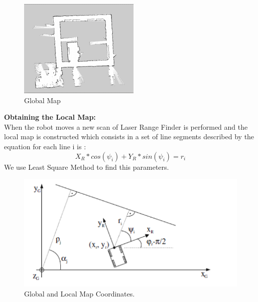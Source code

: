 \documentclass[a4paper]{IEEEtran}
\begin{document}
\begin{figure}[htp]
  \centering
  \includegraphics[width=0.9\columnwidth]{./map3}
  \caption{Global Map}
  \label{fig:Global Map}
\end{figure}

\textbf{Obtaining the Local Map:}\\
When the robot moves a new scan of Laser Range Finder is performed and the local map is constructed which consists in a set of line segments described by the equation for each line i is :
\begin{equation}
X_{R}*cos(\psi_{i})+Y_{R}*sin(\psi_{i})=r_{i}
\end{equation}
We use Least Square Method to find this parameters.

\begin{figure}[htp]
  \centering
  \includegraphics[width=0.9\columnwidth]{./GOBALANDLOCALMAP}
  \caption{Global and Local Map Coordinates.}
  \label{fig:Global and Local Map Coordinates}
\end{figure}
\end{document}
